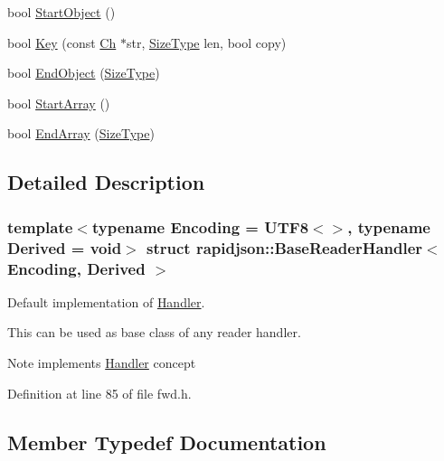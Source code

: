 \begin{DoxyCompactItemize}
\item 
bool \mbox{\hyperlink{structrapidjson_1_1_base_reader_handler_a2f3d3bec89a751cdcf7a4236dbc6b26d}{Start\+Object}} ()
\item 
bool \mbox{\hyperlink{structrapidjson_1_1_base_reader_handler_a92649c2dc3e94e085ee056c17444d418}{Key}} (const \mbox{\hyperlink{structrapidjson_1_1_base_reader_handler_a2932a8ecbb1997dda305f4dbef32ab0d}{Ch}} $\ast$str, \mbox{\hyperlink{namespacerapidjson_a44eb33eaa523e36d466b1ced64b85c84}{Size\+Type}} len, bool copy)
\item 
bool \mbox{\hyperlink{structrapidjson_1_1_base_reader_handler_a6216b7af34bbae857ff06363f5b13f5d}{End\+Object}} (\mbox{\hyperlink{namespacerapidjson_a44eb33eaa523e36d466b1ced64b85c84}{Size\+Type}})
\item 
bool \mbox{\hyperlink{structrapidjson_1_1_base_reader_handler_a0c6fba36350848cb691879758b2d8d59}{Start\+Array}} ()
\item 
bool \mbox{\hyperlink{structrapidjson_1_1_base_reader_handler_a8fc75176ec793217d40d5a8de049cdb3}{End\+Array}} (\mbox{\hyperlink{namespacerapidjson_a44eb33eaa523e36d466b1ced64b85c84}{Size\+Type}})
\end{DoxyCompactItemize}


\subsection{Detailed Description}
\subsubsection*{template$<$typename Encoding = U\+T\+F8$<$$>$, typename Derived = void$>$\newline
struct rapidjson\+::\+Base\+Reader\+Handler$<$ Encoding, Derived $>$}

Default implementation of \mbox{\hyperlink{classrapidjson_1_1_handler}{Handler}}. 

This can be used as base class of any reader handler. \begin{DoxyNote}{Note}
implements \mbox{\hyperlink{classrapidjson_1_1_handler}{Handler}} concept 
\end{DoxyNote}


Definition at line 85 of file fwd.\+h.



\subsection{Member Typedef Documentation}
\mbox{\label{structrapidjson_1_1_base_reader_handler_a2932a8ecbb1997dda305f4dbef32ab0d}} 
